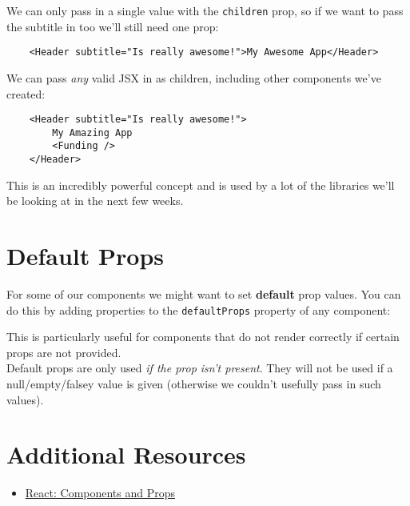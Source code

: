 We can only pass in a single value with the \texttt{children} prop, so if we want to pass the subtitle in too we'll still need one prop:

\begin{verbatim}
    <Header subtitle="Is really awesome!">My Awesome App</Header>
\end{verbatim}

We can pass \textit{any} valid JSX in as children, including other components we've created:

\begin{verbatim}
    <Header subtitle="Is really awesome!">
        My Amazing App
        <Funding />
    </Header>
\end{verbatim}

This is an incredibly powerful concept and is used by a lot of the libraries we'll be looking at in the next few weeks.



\section{Default Props}


For some of our components we might want to set \textbf{default} prop values. You can do this by adding properties to the \texttt{defaultProps} property of any component:


This is particularly useful for components that do not render correctly if certain props are not provided.
\\

Default props are only used \textit{if the prop isn't present}. They will not be used if a null/empty/falsey value is given (otherwise we couldn't usefully pass in such values).


\section{Additional Resources}

\begin{itemize}[leftmargin=*]
    \item \href{https://reactjs.org/docs/components-and-props.html}{React: Components and Props}
\end{itemize}
